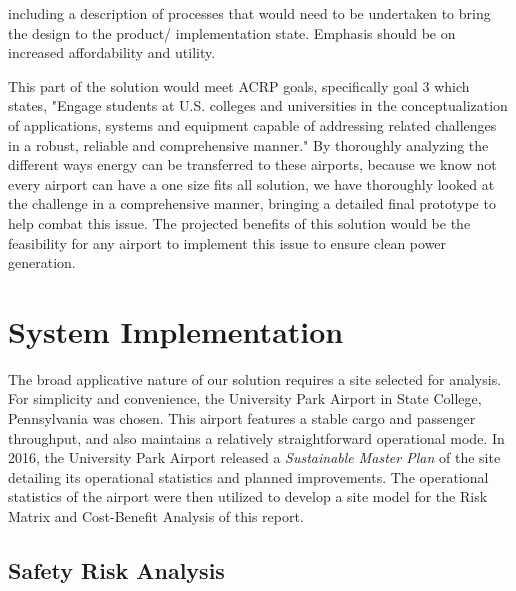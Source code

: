 \documentclass[../main.tex]{subfiles}
\begin{document}
 including a description of processes that would need to be undertaken to bring the design to the product/ implementation state. Emphasis should be on increased affordability and utility.

This part of the solution would meet ACRP goals, specifically goal 3 which states, "Engage students at U.S. colleges and universities in the conceptualization of applications, systems and equipment capable of addressing related challenges in a robust, reliable and comprehensive manner." By thoroughly analyzing the different ways energy can be transferred to these airports, because we know not every airport can have a one size fits all solution, we have thoroughly looked at the challenge in a comprehensive manner, bringing a detailed final prototype to help combat this issue. 
The projected benefits of this solution would be the feasibility for any airport to implement this issue to ensure clean power generation.

\section{System Implementation}
The broad applicative nature of our solution requires a site selected for analysis. For simplicity and convenience, the University Park Airport in State College, Pennsylvania was chosen. This airport features a stable cargo and passenger throughput, and also maintains a relatively straightforward operational mode. In 2016, the University Park Airport released a \emph{Sustainable Master Plan} \cite{SCEplan} of the site detailing its operational statistics and planned improvements. The operational statistics of the airport were then utilized to develop a site model for the Risk Matrix and Cost-Benefit Analysis of this report.\par

\subsection{Safety Risk Analysis} %
\end{document}
